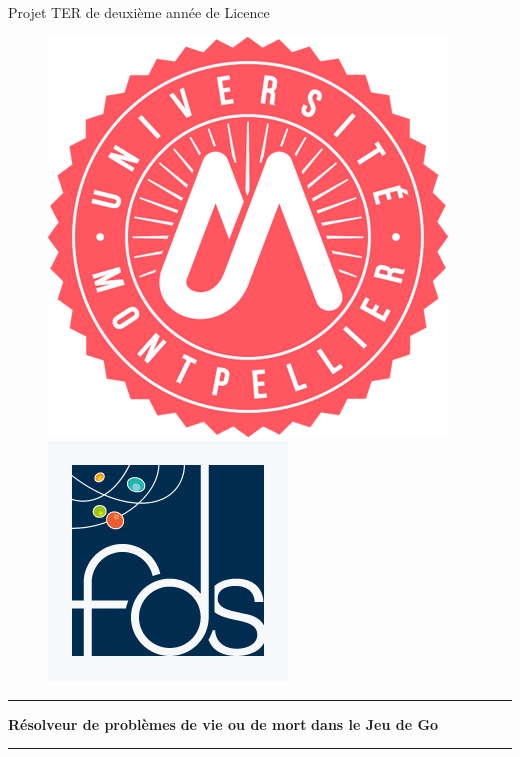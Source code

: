 \begin{titlepage}
    \begin{center}
    
    \newcommand{\HorizontalLine}{\rule{\linewidth}{0.3mm}}
    
    {\Large Projet TER de deuxième année de Licence}\\[1.3cm]
    \begin{figure}[h!]
        \centering
        \includegraphics[scale=1]{figures/experiments/um.png}
        \includegraphics[scale=0.4]{figures/experiments/fds_logo.jpg}
        \label{fig:logos}
    \end{figure}
    
    \HorizontalLine %
    \begin{spacing}{3}
        {\huge \bfseries Résolveur de problèmes } 
        {\huge \bfseries de vie ou de mort} 
        {\huge \bfseries dans le Jeu de Go}
    \end{spacing}
    \HorizontalLine \\[1.5cm]
    

\end{center}
\end{titlepage}
